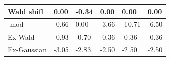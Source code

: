 \begin{tabular}{|l|l|l|l|l|l|}
\hline
Wald shift&0.00&-0.34&0.00&0.00&0.00\\\hline
\rocdd{}-mod&-0.66&0.00&-3.66&-10.71&-6.50\\\hline
Ex-Wald&-0.93&-0.70&-0.36&-0.36&-0.36\\\hline
Ex-Gaussian&-3.05&-2.83&-2.50&-2.50&-2.50\\\hline
\end{tabular}
